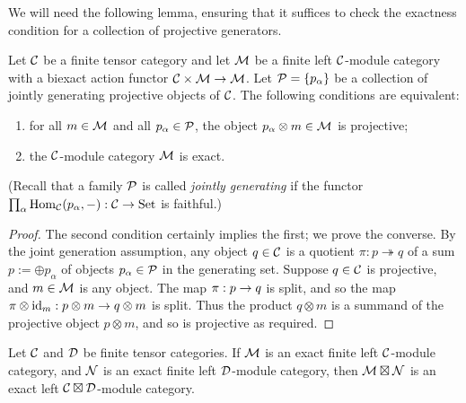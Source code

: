 \documentclass{amsart}
\begin{document}
We will need the following lemma, ensuring that it suffices to check the exactness condition for a collection of projective generators.

\begin{lemma} \label{lma:Exact_checked_on_proj_gens}
	Let $\mathcal C$ be a finite tensor category and let $\mathcal M$ be a finite left $\mathcal C$-module category with a biexact action functor $\mathcal C \times \mathcal M \rightarrow \mathcal M$. Let $\mathcal P = \{ p_\alpha \}$ be a collection of jointly generating projective objects of  $\mathcal C$. The following conditions are equivalent:
	\begin{enumerate}
		\item for all $m \in \mathcal M$ and all $p_\alpha \in \mathcal P$, the object $p_\alpha \otimes m \in \mathcal M$ is projective;
		\item the $\mathcal C$-module category $\mathcal M$ is exact.
	\end{enumerate}
\end{lemma}

\noindent (Recall that a family $\mathcal P$ is called {\em jointly generating} if the functor $\prod_\alpha \operatorname{Hom}_\mathcal C(p_\alpha, -): \mathcal C \to \mathrm{Set}$ is faithful.) %

\begin{proof}
The second condition certainly implies the first; we prove the converse.  By the joint generation assumption, any object $q \in \mathcal C$ is a quotient $\pi: p \twoheadrightarrow q$ of a sum $p := \oplus p_\alpha$ of objects $p_\alpha \in \mathcal P$ in the generating set.  Suppose $q \in \mathcal C$ is projective, and $m \in \mathcal M$ is any object.  The map $\pi: p \rightarrow q$ is split, and so the map $\pi \otimes \mathrm{id}_m: p \otimes m \rightarrow q \otimes m$ is split.  Thus the product $q \otimes m$ is a summand of the projective object $p \otimes m$, and so is projective as required.
\end{proof}

\begin{theorem}\label{thm:tensor-exactness}
Let $\mathcal C$ and $\mathcal D$ be finite tensor categories.  If $\mathcal M$ is an exact finite left $\mathcal C$-module category, and $\mathcal N$ is an exact finite left $\mathcal D$-module category, then $\mathcal M \boxtimes \mathcal N$ is an exact left $\mathcal C \boxtimes \mathcal D$-module category.
\end{theorem}
\end{document}
